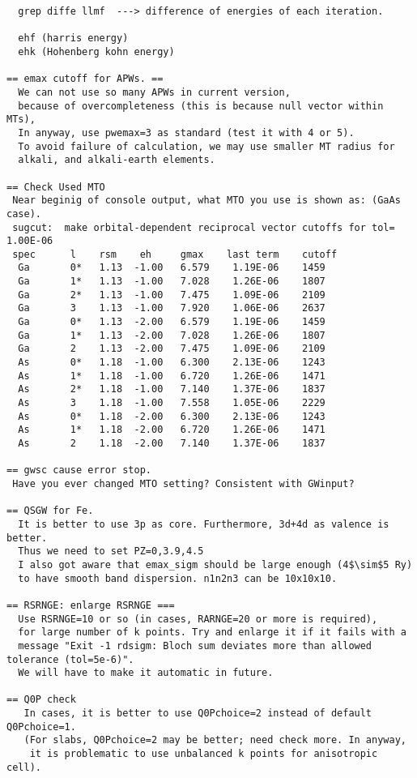\documentclass[a4paper,10pt,epsf,fleqn]{article}
\begin{document}
\begin{verbatim}
  grep diffe llmf  ---> difference of energies of each iteration.

  ehf (harris energy)
  ehk (Hohenberg kohn energy)

== emax cutoff for APWs. ==
  We can not use so many APWs in current version,
  because of overcompleteness (this is because null vector within MTs), 
  In anyway, use pwemax=3 as standard (test it with 4 or 5).
  To avoid failure of calculation, we may use smaller MT radius for
  alkali, and alkali-earth elements. 

== Check Used MTO 
 Near beginig of console output, what MTO you use is shown as: (GaAs case).
 sugcut:  make orbital-dependent reciprocal vector cutoffs for tol= 1.00E-06
 spec      l    rsm    eh     gmax    last term    cutoff
  Ga       0*   1.13  -1.00   6.579    1.19E-06    1459
  Ga       1*   1.13  -1.00   7.028    1.26E-06    1807
  Ga       2*   1.13  -1.00   7.475    1.09E-06    2109
  Ga       3    1.13  -1.00   7.920    1.06E-06    2637
  Ga       0*   1.13  -2.00   6.579    1.19E-06    1459
  Ga       1*   1.13  -2.00   7.028    1.26E-06    1807
  Ga       2    1.13  -2.00   7.475    1.09E-06    2109
  As       0*   1.18  -1.00   6.300    2.13E-06    1243
  As       1*   1.18  -1.00   6.720    1.26E-06    1471
  As       2*   1.18  -1.00   7.140    1.37E-06    1837
  As       3    1.18  -1.00   7.558    1.05E-06    2229
  As       0*   1.18  -2.00   6.300    2.13E-06    1243
  As       1*   1.18  -2.00   6.720    1.26E-06    1471
  As       2    1.18  -2.00   7.140    1.37E-06    1837

== gwsc cause error stop.
 Have you ever changed MTO setting? Consistent with GWinput?

== QSGW for Fe.
  It is better to use 3p as core. Furthermore, 3d+4d as valence is better. 
  Thus we need to set PZ=0,3.9,4.5
  I also got aware that emax_sigm should be large enough (4$\sim$5 Ry) 
  to have smooth band dispersion. n1n2n3 can be 10x10x10.

== RSRNGE: enlarge RSRNGE ===
  Use RSRNGE=10 or so (in cases, RARNGE=20 or more is required), 
  for large number of k points. Try and enlarge it if it fails with a
  message "Exit -1 rdsigm: Bloch sum deviates more than allowed tolerance (tol=5e-6)".
  We will have to make it automatic in future.

== Q0P check
   In cases, it is better to use Q0Pchoice=2 instead of default Q0Pchoice=1.
   (For slabs, Q0Pchoice=2 may be better; need check more. In anyway,
    it is problematic to use unbalanced k points for anisotropic cell).


\end{verbatim}
\end{document}
